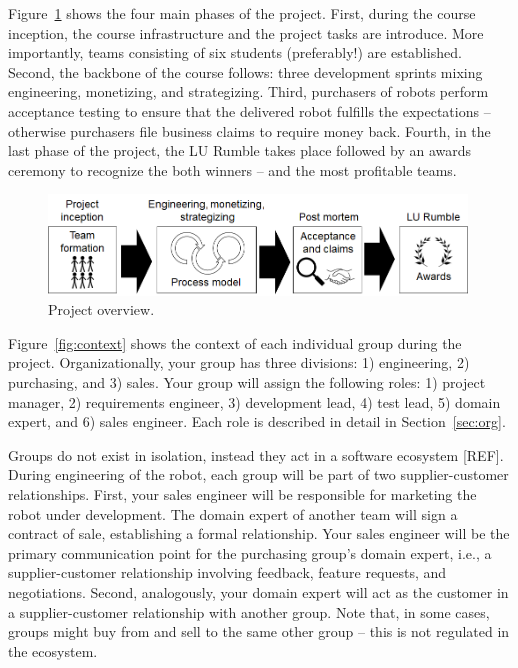 \documentclass{scrreprt}
\begin{document}
Figure~\ref{fig:overview} shows the four main phases of the project. First, during the course inception, the course infrastructure and the project tasks are introduce. More importantly, teams consisting of six students (preferably!) are established. Second, the backbone of the course follows: three development sprints mixing engineering, monetizing, and strategizing. Third, purchasers of robots perform acceptance testing to ensure that the delivered robot fulfills the expectations -- otherwise purchasers file business claims to require money back. Fourth, in the last phase of the project, the LU Rumble takes place followed by an awards ceremony to recognize the both winners -- and the most profitable teams.

\begin{figure}
\centering
\includegraphics[width=0.99\textwidth]{figures/projectOverview.png}
\caption{Project overview.}
\label{fig:overview}
\end{figure}

Figure~\ref{fig:context} shows the context of each individual group during the project. Organizationally, your group has three divisions: 1) engineering, 2) purchasing, and 3) sales. Your group will assign the following roles: 1) project manager, 2) requirements engineer, 3) development lead, 4) test lead, 5) domain expert, and 6) sales engineer. Each role is described in detail in Section~\ref{sec:org}.

Groups do not exist in isolation, instead they act in a software ecosystem [REF]. During engineering of the robot, each group will be part of two supplier-customer relationships. First, your sales engineer will be responsible for marketing the robot under development. The domain expert of another team will sign a contract of sale, establishing a formal relationship. Your sales engineer will be the primary communication point for the purchasing group's domain expert, i.e., a supplier-customer relationship involving feedback, feature requests, and negotiations. Second, analogously, your domain expert will act as the customer in a supplier-customer relationship with another group. Note that, in some cases, groups might buy from and sell to the same other group -- this is not regulated in the ecosystem.
\end{document}
